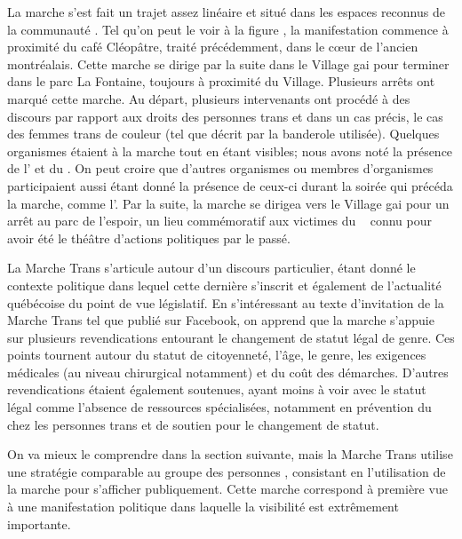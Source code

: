 La marche s'est fait un trajet assez linéaire et situé dans les espaces reconnus de la communauté \lgbt{}.
Tel qu'on peut le voir à la figure , la manifestation commence à proximité du café Cléopâtre, traité précédemment, dans le cœur de l'ancien  montréalais.
Cette marche se dirige par la suite dans le Village gai pour terminer dans le parc La Fontaine, toujours à proximité du Village.
Plusieurs arrêts ont marqué cette marche.
Au départ, plusieurs intervenants ont procédé à des discours par rapport aux droits des personnes trans et dans un cas précis, le cas des femmes trans de couleur (tel que décrit par la banderole utilisée).
Quelques organismes étaient à la marche tout en étant visibles; nous avons noté la présence de l'\atq{} et du \rlq{}.
On peut croire que d'autres organismes ou membres d'organismes participaient aussi étant donné la présence de ceux-ci durant la soirée qui précéda la marche, comme l'\astteq{}.
Par la suite, la marche se dirigea vers le Village gai pour un arrêt au parc de l'espoir, un lieu commémoratif aux victimes du \sida{}~\citep{Lafontaine2012} connu pour avoir été le théâtre d'actions politiques par le passé.

La Marche Trans s'articule autour d'un discours particulier, étant donné le contexte politique dans lequel cette dernière s'inscrit et également de l'actualité québécoise du point de vue législatif.
En s'intéressant au texte d'invitation de la Marche Trans tel que publié sur Facebook, on apprend que la marche s'appuie sur plusieurs revendications entourant le changement de statut légal de genre.
Ces points tournent autour du statut de citoyenneté, l'âge, le genre, les exigences médicales (au niveau chirurgical notamment) et du coût des démarches.
D'autres revendications étaient également soutenues, ayant moins à voir avec le statut légal comme l'absence de ressources spécialisées, notamment en prévention du \vih{} chez les personnes trans et de soutien pour le changement de statut.

On va mieux le comprendre dans la section suivante, mais la Marche Trans utilise une stratégie comparable au groupe des personnes \dyke{}, consistant en l'utilisation de la marche pour s'afficher publiquement.
Cette marche correspond à première vue à une manifestation politique dans laquelle la visibilité est extrêmement importante.

